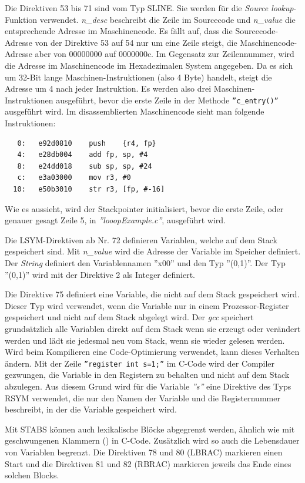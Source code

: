 Die Direktiven 53 bis 71 sind vom Typ SLINE.
Sie werden für die \textit{Source lookup}-Funktion verwendet.
\textit{n\_desc} beschreibt die Zeile im Sourcecode und \textit{n\_value} die entsprechende Adresse im Maschinencode.
Es fällt auf, dass die Sourcecode-Adresse von der Direktive 53 auf 54 nur um eine Zeile steigt, die Maschinencode-Adresse aber von 00000000 auf 0000000c.
Im Gegensatz zur Zeilennummer, wird die Adresse im Maschinencode im Hexadezimalen System angegeben.
Da es sich um 32-Bit lange Maschinen-Instruktionen (also 4 Byte) handelt, steigt die Adresse um 4 nach jeder Instruktion.
Es werden also drei Maschinen-Instruktionen ausgeführt, bevor die erste Zeile in der Methode \texttt{''c\_entry()''} ausgeführt wird.
Im disassemblierten Maschinencode sieht man folgende Instruktionen:
\lstset{language=plain}
\begin{lstlisting}
   0:	e92d0810 	push	{r4, fp}
   4:	e28db004 	add	fp, sp, #4
   8:	e24dd018 	sub	sp, sp, #24
   c:	e3a03000 	mov	r3, #0
  10:	e50b3010 	str	r3, [fp, #-16]
\end{lstlisting}

Wie es aussieht, wird der Stackpointer initialisiert, bevor die erste Zeile, oder genauer gesagt Zeile 5, in \textit{''looopExample.c''}, ausgeführt wird.

Die LSYM-Direktiven ab Nr. 72 definieren Variablen, welche auf dem Stack gespeichert sind.
Mit \textit{n\_value} wird die Adresse der Variable im Speicher definiert.
Der \textit{String} definiert den Variablennamen ''x00'' und den Typ ''(0,1)''.
Der Typ ''(0,1)'' wird mit der Direktive 2 als Integer definiert.

Die Direktive 75 definiert eine Variable, die nicht auf dem Stack gespeichert wird.
Dieser Typ wird verwendet, wenn die Variable nur in einem Prozessor-Register gespeichert und nicht auf dem Stack abgelegt wird.
Der \textit{gcc} speichert grundsätzlich alle Variablen direkt auf dem Stack wenn sie erzeugt oder verändert werden und lädt sie jedesmal neu vom Stack, wenn sie wieder gelesen werden.
Wird beim Kompilieren eine Code-Optimierung verwendet, kann dieses Verhalten ändern.
Mit der Zeile \texttt{{''register int s=1;''}} im C-Code wird der Compiler gezwungen, die Variable in den Registern zu behalten und nicht auf dem Stack abzulegen.
Aus diesem Grund wird für die Variable \textit{''s''} eine Direktive des Typs RSYM verwendet, die nur den Namen der Variable und die Registernummer beschreibt, in der die Variable gespeichert wird.

Mit STABS können auch lexikalische Blöcke abgegrenzt werden, ähnlich wie mit geschwungenen Klammern ({}) in C-Code.
Zusätzlich wird so auch die Lebensdauer von Variablen begrenzt.
Die Direktiven 78 und 80 (LBRAC) markieren einen Start und die Direktiven 81 und 82 (RBRAC) markieren jeweils das Ende eines solchen Blocks.


